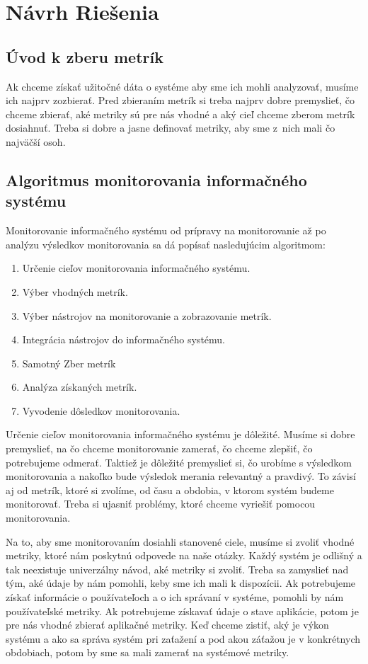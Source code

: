 \documentclass[a4paper, usesections, upjsfrontpage, disablespecwarning, thesismargins, thesislinespacing]{rnthesissvk}
\begin{document}
\newpage

\section{Návrh Riešenia}

\subsection{Úvod k zberu metrík}

Ak chceme získať užitočné dáta o systéme aby sme ich mohli analyzovať, musíme ich najprv zozbierať.
Pred zbieraním metrík si treba najprv dobre premyslieť, čo chceme zbierať, 
aké metriky sú pre nás vhodné a aký cieľ chceme zberom metrík dosiahnuť.
Treba si dobre a jasne definovať metriky, aby sme z~nich mali čo najväčší osoh.

\subsection{Algoritmus monitorovania informačného systému}

Monitorovanie informačného systému od prípravy na monitorovanie až po analýzu výsledkov monitorovania sa dá popísať nasledujúcim algoritmom:

\begin{enumerate}
	\item Určenie cieľov monitorovania informačného systému.
	\item Výber vhodných metrík.
	\item Výber nástrojov na monitorovanie a zobrazovanie metrík.
	\item Integrácia nástrojov do informačného systému.
	\item Samotný Zber metrík
	\item Analýza získaných metrík.
	\item Vyvodenie dôsledkov monitorovania.
\end{enumerate}

Určenie cieľov monitorovania informačného systému je dôležité.
Musíme si dobre premyslieť, na čo chceme monitorovanie zamerať, čo chceme zlepšiť, čo potrebujeme odmerať.
Taktiež je dôležité premyslieť si, čo urobíme s výsledkom monitorovania a nakoľko bude výsledok merania relevantný a pravdivý.
To závisí aj od metrík, ktoré si zvolíme, od času a obdobia, v ktorom systém budeme monitorovať.
Treba si ujasniť problémy, ktoré chceme vyriešiť pomocou monitorovania.

Na to, aby sme monitorovaním dosiahli stanovené ciele, musíme si zvoliť vhodné metriky, 
	ktoré nám poskytnú odpovede na naše otázky.
Každý systém je odlišný a tak neexistuje univerzálny návod, aké metriky si zvoliť.
Treba sa zamyslieť nad tým, aké údaje by nám pomohli, keby sme ich mali k dispozícii.
Ak potrebujeme získať informácie o používateľoch a o ich správaní v systéme, pomohli by nám používateľské metriky.
Ak potrebujeme získavať údaje o stave aplikácie, potom je pre nás vhodné zbierať aplikačné metriky.
Keď chceme zistiť, aký je výkon systému a ako sa správa systém pri zaťažení a pod akou záťažou je v konkrétnych obdobiach, potom by sme sa mali zamerať na systémové metriky.
\end{document}
